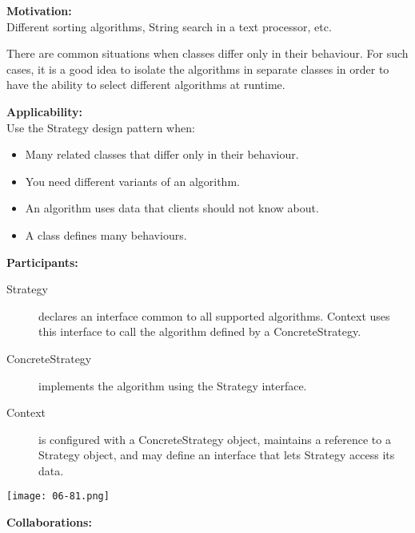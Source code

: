 \vspace{12pt}\textbf{Motivation:}\\
Different sorting algorithms, String search in a text processor, etc.

There are common situations when classes differ only in their behaviour. For such cases, it is a good idea to isolate the algorithms in separate classes in order to have the ability to select different algorithms at runtime.


\vspace{12pt}\textbf{Applicability:}\\

Use the Strategy design pattern when:


\begin{itemize}
\item Many related classes that differ only in their behaviour.
\item You need different variants of an algorithm.
\item An algorithm uses data that clients should not know about.
\item A class defines many behaviours.
\end{itemize}

\vspace{12pt}\textbf{Participants:}\\


\begin{description}
\item[Strategy]

	declares an interface common to all supported algorithms. Context uses this interface to call the algorithm defined by a ConcreteStrategy.

\item[ConcreteStrategy]

	implements the algorithm using the Strategy interface.

\item[Context]

	is configured with a ConcreteStrategy object, maintains a reference to a Strategy object, and may define an interface that lets Strategy access its data.

\end{description}

\begin{center}
\texttt{[image: 06-81.png]}
\end{center}

\vspace{12pt}\textbf{Collaborations:}\\

